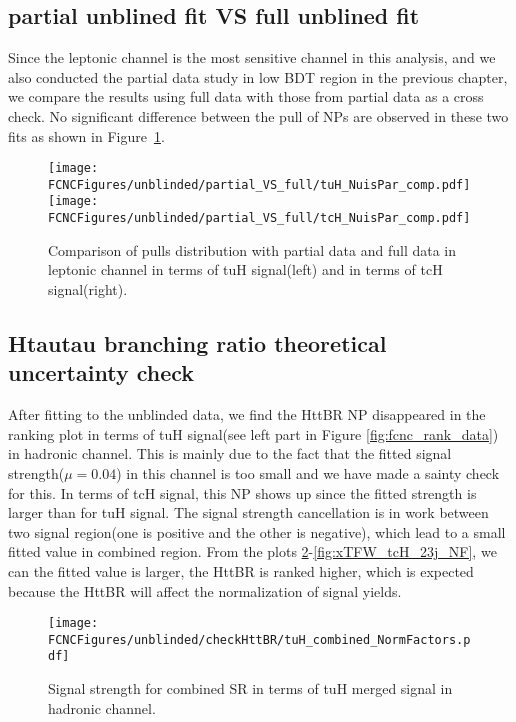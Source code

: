 \subsection{partial unblined fit VS full unblined fit}
Since the leptonic channel is the most sensitive channel in this analysis, and we also conducted the partial data study in low BDT region in the previous chapter, we compare the results using full data with those from partial data as a cross check.
No significant difference between the pull of NPs are observed in these two fits as shown in Figure~\ref{fig:tthML_partialVSfull}.

\begin{figure}[H]
\centering
\texttt{[image: \\FCNCFigures/unblinded/partial\_VS\_full/tuH\_NuisPar\_comp.pdf]}
\texttt{[image: \\FCNCFigures/unblinded/partial\_VS\_full/tcH\_NuisPar\_comp.pdf]}
\\
\caption{Comparison of pulls distribution with partial data and full data in leptonic channel in terms of tuH signal(left) and in terms of tcH signal(right).}
\label{fig:tthML_partialVSfull}
\end{figure}

\subsection{Htautau branching ratio theoretical uncertainty check}
After fitting to the unblinded data, we find the HttBR NP disappeared in the ranking plot in terms of tuH signal(see left part in Figure \ref{fig:fcnc_rank_data}) in hadronic channel. This is mainly due to the fact that the fitted signal strength($\mu=0.04$) in this channel is too small and we have made a sainty check for this. In terms of tcH signal, this NP shows up since the fitted strength is larger than for tuH signal. The signal strength cancellation is in work between two signal region(one is positive and the other is negative), which lead to a small fitted value in combined region. From the plots \ref{fig:xTFW_tuH_NF}-\ref{fig:xTFW_tcH_23j_NF}, we can the fitted value is larger, the HttBR is ranked higher, which is expected because the HttBR will affect the normalization of signal yields.


\begin{figure}[H]
\centering
\texttt{[image: \\FCNCFigures/unblinded/checkHttBR/tuH\_combined\_NormFactors.pdf]}
\\
\caption{Signal strength for combined SR in terms of tuH merged signal in hadronic channel.}
\label{fig:xTFW_tuH_NF}
\end{figure}



